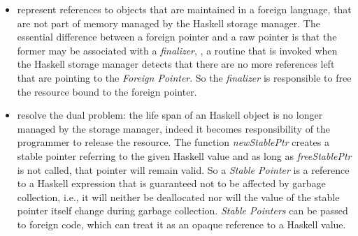 \begin{itemize}
\item {} represent references to objects that are maintained in a foreign language, \ie that are not part of memory managed by the Haskell storage manager.
The essential difference between a foreign pointer and a raw pointer is that the former may be associated with a \emph{finalizer}, \ie, a routine that is invoked when the Haskell storage manager detects that there are no more references left that are pointing to the \emph{Foreign Pointer}.
So the \emph{finalizer} is responsible to free the resource bound to the foreign pointer.

\item {}\label{ffi:stableptr} resolve the dual problem: the life span of an Haskell object is no longer managed by the storage manager, indeed it becomes responsibility of the programmer to release the resource.
The function \emph{newStablePtr} creates a stable pointer referring to the given Haskell value and as long as \emph{freeStablePtr} is not called, that pointer will remain valid.
So a \emph{Stable Pointer} is a reference to a Haskell expression that is guaranteed not to be affected by garbage collection, i.e., it will neither be deallocated nor will the value of the stable pointer itself change during garbage collection. \emph{Stable Pointers} can be passed to foreign code, which can treat it as an opaque reference to a Haskell value.
\end{itemize}